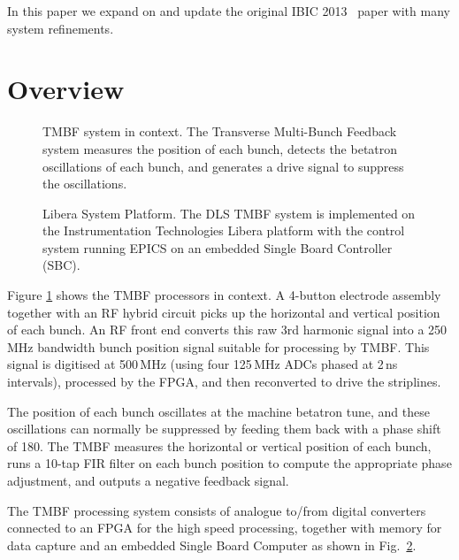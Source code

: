\documentclass{jacow}
\begin{document}
In this paper we expand on and update the original IBIC 2013~\cite{ibic2013}
paper with many system refinements.



\section{Overview}

\begin{figure}[ht]
\begin{centering}

\end{centering}
\caption{
TMBF system in context.  The Transverse Multi-Bunch Feedback system measures the
position of each bunch, detects the betatron oscillations of each bunch, and
generates a drive signal to suppress the oscillations.
}
\label{context}
\end{figure}


\begin{figure}[ht]
\begin{centering}

\end{centering}
\caption{
Libera System Platform.  The DLS TMBF system is implemented on the
Instrumentation Technologies Libera platform with the control system running
EPICS on an embedded Single Board Controller (SBC).
}
\label{system}
\end{figure}


Figure \ref{context} shows the TMBF processors in context.  A 4-button electrode
assembly together with an RF hybrid circuit picks up the horizontal and vertical
position of each bunch.  An RF front end converts this raw 3rd harmonic signal
into a 250\,MHz bandwidth bunch position signal suitable for processing by TMBF.
This signal is digitised at 500\,MHz (using four 125\,MHz ADCs phased at 2\,ns
intervals), processed by the FPGA, and then reconverted to drive the striplines.

The position of each bunch oscillates at the machine betatron tune, and these
oscillations can normally be suppressed by feeding them back with a phase shift
of 180\textdegree.  The TMBF measures the horizontal or vertical position of
each bunch, runs a 10-tap FIR filter on each bunch position to compute the
appropriate phase adjustment, and outputs a negative feedback signal.

The TMBF processing system consists of analogue to/from digital converters
connected to an FPGA for the high speed processing, together with memory for
data capture and an embedded Single Board Computer as shown in
Fig.~\ref{system}.
\end{document}
